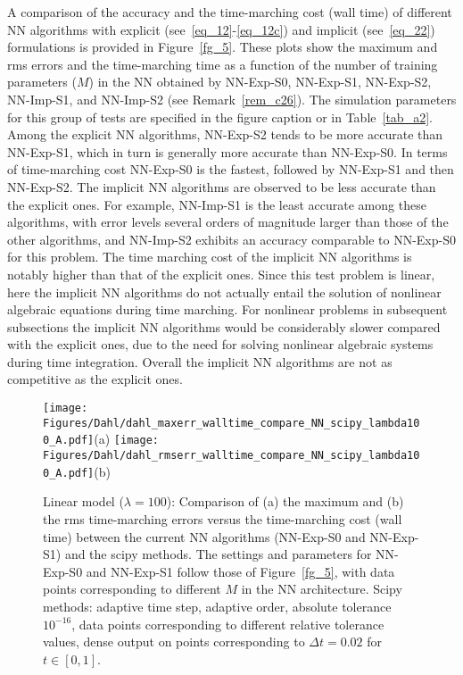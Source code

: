A comparison of the accuracy and the time-marching cost (wall time)
of different NN algorithms with explicit (see~\eqref{eq_12}-\eqref{eq_12c})
and implicit (see~\eqref{eq_22})  formulations
is provided in Figure~\ref{fg_5}. These plots show the
maximum and rms errors and the time-marching time
as a function of the number of
training parameters ($M$) in the NN obtained by
NN-Exp-S0, NN-Exp-S1, NN-Exp-S2, NN-Imp-S1,
and NN-Imp-S2 (see Remark~\ref{rem_c26}).
The simulation parameters for this group of tests are specified in
the figure caption or in Table~\ref{tab_a2}.
Among the explicit NN algorithms, NN-Exp-S2 tends to be more
accurate than NN-Exp-S1, which in turn is generally more accurate
than NN-Exp-S0. In terms of time-marching cost 
NN-Exp-S0 is the fastest, followed by NN-Exp-S1 and then NN-Exp-S2.
The implicit NN algorithms 
are observed to be less accurate than the explicit ones.
For example, NN-Imp-S1 is the least accurate among these algorithms, with error levels
several orders of magnitude larger than those of the other algorithms,
and NN-Imp-S2 exhibits an accuracy comparable to NN-Exp-S0 for this problem.
The time marching cost of the implicit NN algorithms is notably higher than 
that of the explicit ones.
Since this test problem is linear, here the implicit NN algorithms do not actually
entail the solution of nonlinear algebraic equations during time marching.
For nonlinear problems in subsequent subsections
the implicit NN algorithms would be considerably slower compared with
the explicit ones, due to the need for solving nonlinear algebraic
systems during time integration.
Overall the implicit NN algorithms are not as competitive as the explicit ones.



\begin{figure}
  \centerline{
    \texttt{[image: Figures/Dahl/dahl\_maxerr\_walltime\_compare\_NN\_scipy\_lambda100\_A.pdf]}(a)
    \texttt{[image: Figures/Dahl/dahl\_rmserr\_walltime\_compare\_NN\_scipy\_lambda100\_A.pdf]}(b)
  }
  \caption{Linear model ($\lambda=100$):
    Comparison of
    (a) the maximum and (b) the rms time-marching errors 
    versus the time-marching cost (wall time)
    between the current NN algorithms (NN-Exp-S0 and NN-Exp-S1)
    and the scipy methods.
    The settings and parameters for NN-Exp-S0 and NN-Exp-S1
    follow those of Figure~\ref{fg_5}, with
    data points corresponding to different $M$ in the NN architecture.
    Scipy methods: adaptive time step, adaptive order, absolute tolerance $10^{-16}$,
    data points corresponding to different relative tolerance values,
    dense output on points corresponding to $\Delta t=0.02$ for $t\in[0,1]$.
  }
  \label{fg_6}
\end{figure}


